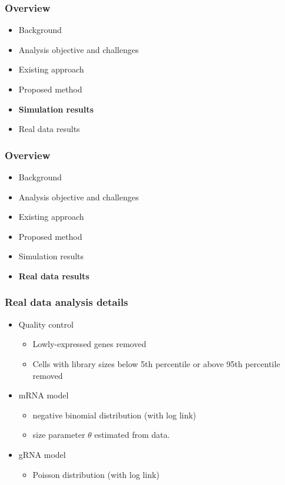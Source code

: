 \documentclass{beamer}
\begin{document}
\begin{frame}
\frametitle{Overview}
\begin{itemize}
	\item Background
	\item Analysis objective and challenges
	\item Existing approach
	\item Proposed method
	\item \textbf{Simulation results}
	\item Real data results
\end{itemize}
\end{frame}


\begin{frame}
\frametitle{Overview}
\begin{itemize}
	\item Background
	\item Analysis objective and challenges
	\item Existing approach
	\item Proposed method
	\item Simulation results
	\item\textbf{Real data results}
\end{itemize}
\end{frame}

\begin{frame}
\frametitle{Real data analysis details}
\begin{itemize}
\item Quality control
\begin{itemize}
\item Lowly-expressed genes removed
\item Cells with library sizes below 5th percentile or above 95th percentile removed
\end{itemize}
\item mRNA model
\begin{itemize}
\item negative binomial distribution (with log link)
\item size parameter $\theta$ estimated from data.
\end{itemize}
\item gRNA model
\begin{itemize}
\item Poisson distribution (with log link) \cite{Choudhary2021}
\end{itemize}
\end{itemize}
\end{frame}







\end{document}
